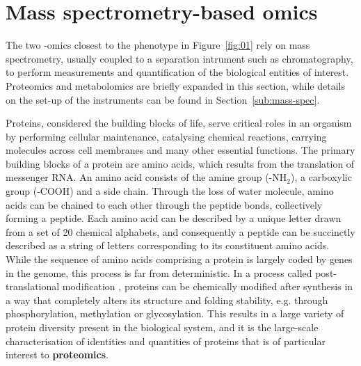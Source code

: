 \section{Mass spectrometry-based omics\label{sub:omics}}

The two -omics closest to the phenotype in Figure~\ref{fig:01} rely on mass spectrometry, usually coupled to a separation intrument such as chromatography, to perform measurements and quantification of the biological entities of interest. Proteomics and metabolomics are briefly expanded in this section, while details on the set-up of the instruments can be found in Section~\ref{sub:mass-spec}.

Proteins, considered the building blocks of life, serve critical roles in an organism by performing cellular maintenance, catalysing chemical reactions, carrying molecules across cell membranes and many other essential functions. The primary building blocks of a protein are amino acids, which results from the translation of messenger RNA. An amino acid consists of the amine group (-NH$_2$), a carboxylic group (-COOH) and a side chain. Through the loss of water molecule, amino acids can be chained to each other through the peptide bonds, collectively forming a peptide. Each amino acid can be described by a unique letter drawn from a set of 20 chemical alphabets, and consequently a peptide can be succinctly described as a string of letters corresponding to its constituent amino acids. While the sequence of amino acids comprising a protein is largely coded by genes in the genome, this process is far from deterministic. In a process called post-translational modification \cite{mann2003proteomic}, proteins can be chemically modified after synthesis in a way that completely alters its structure and folding stability, e.g. through phosphorylation, methylation or glycosylation. This results in a large variety of protein diversity present in the biological system, and it is the large-scale characterisation of identities and quantities of proteins that is of particular interest to \textbf{proteomics}. 


